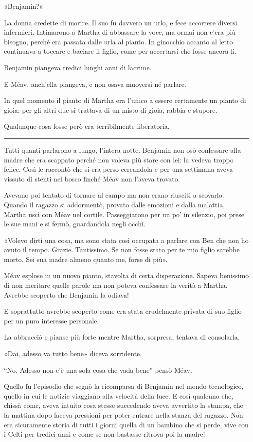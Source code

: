 «Benjamin?»

La donna credette di morire. Il suo fu davvero un urlo, e fece accorrere diversi infermieri.
Intimarono a Martha di abbassare la voce, ma ormai non c’era più bisogno, perché era passata dalle
urla al pianto. In ginocchio accanto al letto continuava a toccare e baciare il figlio, come per
accertarsi che fosse ancora lì.

Benjamin piangeva tredici lunghi anni di lacrime.

E Méav, anch’ella piangeva, e non osava muoversi né parlare.

In quel momento il pianto di Martha era l’unico a essere certamente un pianto di gioia: per gli
altri due si trattava di un misto di gioia, rabbia e stupore.

Qualunque cosa fosse però era terribilmente liberatoria.

\plainbreak{1}

Tutti quanti parlarono a lungo, l’intera notte. Benjamin non osò confessare alla madre che era
scappato perché non voleva più stare con lei: la vedeva troppo felice. Così le raccontò che si era
perso cercandola e per una settimana aveva vissuto di stenti nel bosco finché Méav non l’aveva
trovato.

Avevano poi tentato di tornare al campo ma non erano riusciti a scovarlo. Quando il ragazzo si
addormentò, provato dalle emozioni e dalla malattia, Martha uscì con Méav nel cortile. Passeggiarono
per un po’ in silenzio, poi prese le sue mani e si fermò, guardandola negli occhi.

«Volevo dirti una cosa, ma sono stata così occupata a parlare con Ben che non ho avuto il tempo.
Grazie. Tantissimo. Se non fosse stato per te mio figlio sarebbe morto. Sei sua madre almeno quanto
me, forse di più».

Méav esplose in un nuovo pianto, stavolta di certa disperazione. Sapeva benissimo di non meritare
quelle parole ma non poteva confessare la verità a Martha. Avrebbe scoperto che Benjamin la odiava!

E soprattutto avrebbe scoperto come era stata crudelmente privata di suo figlio per un puro
interesse personale.

La abbracciò e pianse più forte mentre Martha, sorpresa, tentava di consolarla.

«Dai, adesso va tutto bene» diceva sorridente.

``No. Adesso non c’è una sola cosa che vada bene'' pensò Méav.

Quello fu l’episodio che segnò la ricomparsa di Benjamin nel mondo tecnologico, quello in cui le
notizie viaggiano alla velocità della luce. E così qualcuno che, chissà come, aveva intuito cosa
stesse succedendo aveva avvertito la stampa, che la mattina dopo faceva pressioni per poter entrare
nella stanza del ragazzo. Non era sicuramente storia di tutti i giorni quella di un bambino che si
perde, vive con i Celti per tredici anni e come se non bastasse ritrova poi la madre!

